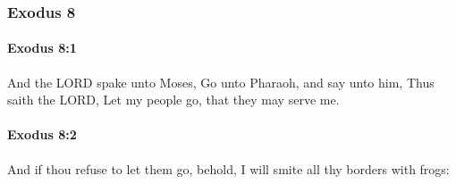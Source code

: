 	\subsubsection{Exodus 8} %
		\label{EXODUS-8}

		\paragraph{Exodus 8:1} %
			\label{EXODUS-8-1}

			And the LORD spake unto Moses, Go unto Pharaoh, and say unto him, Thus saith the LORD, Let my people go, that they may serve me.


		\paragraph{Exodus 8:2} %
			\label{EXODUS-8-2}

			And if thou refuse to let them go, behold, I will smite all thy borders with frogs:

